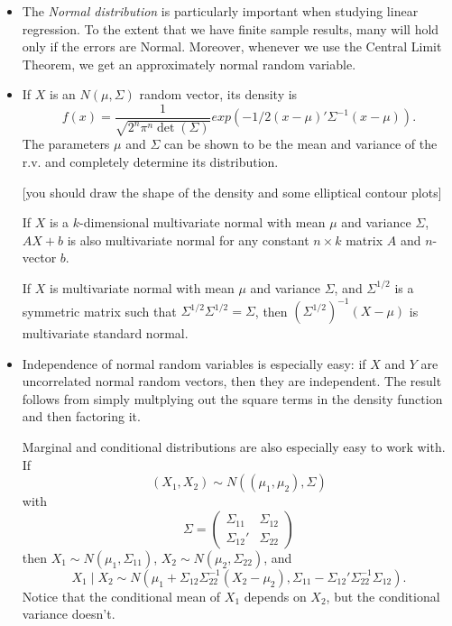 \begin{itemize}[leftmargin=0pt]

\item The \emph{Normal distribution} is particularly important when
  studying linear regression.  To the extent that we have finite
  sample results, many will hold only if the errors are Normal.
  Moreover, whenever we use the Central Limit Theorem, we get an
  approximately normal random variable.

\item If $X$ is an $N(\mu, \Sigma)$ random vector, its density is
  \begin{equation*}
    f(x) = \frac{1}{\sqrt{2^n \pi^n \det(\Sigma)}} exp(-1/2(x - \mu)'\Sigma^{-1}(x- \mu)).
  \end{equation*}
  The parameters $\mu$ and $\Sigma$ can be shown to be the mean and variance
  of the r.v. and completely determine its distribution.

  [you should draw the shape of the density and some elliptical
  contour plots]

  If $X$ is a $k$-dimensional multivariate normal with mean $\mu$
  and variance $\Sigma$, $A X + b$ is also multivariate normal for any
  constant $n \times k$ matrix $A$ and $n$-vector $b$.

  If $X$ is multivariate normal with mean $\mu$ and variance $\Sigma$,
  and $\Sigma^{1/2}$ is a symmetric matrix such that $\Sigma^{1/2} \Sigma^{1/2} = \Sigma$,
  then $(\Sigma^{1/2})^{-1} (X - \mu)$ is multivariate standard normal.

\item Independence of normal random variables is especially easy: if
  $X$ and $Y$ are uncorrelated normal random vectors, then they are
  independent.  The result follows from simply multplying out the
  square terms in the density function and then factoring it.

  Marginal and conditional distributions are also especially easy to
  work with.  If 
  \begin{equation*}
    (X_1,X_2) \sim N((\mu_1,\mu_2), \Sigma)
  \end{equation*}
  with
  \begin{equation*}
    \Sigma = \begin{pmatrix}
      \Sigma_{11} & \Sigma_{12} \\ \Sigma_{12}' & \Sigma_{22}
    \end{pmatrix}
  \end{equation*}
  then $X_1 \sim N(\mu_1, \Sigma_{11})$, $X_2 \sim N(\mu_2, \Sigma_{22})$, and
  \begin{equation*}    
    X_1 \mid X_2 \sim N(\mu_1 + \Sigma_{12} \Sigma_{22}^{-1} (X_2 - \mu_2),
               \Sigma_{11} - \Sigma_{12}'\Sigma_{22}^{-1} \Sigma_{12}).
  \end{equation*}
  Notice that the conditional mean of $X_1$ depends on $X_2$, but the
  conditional variance doesn't.


\end{itemize}
